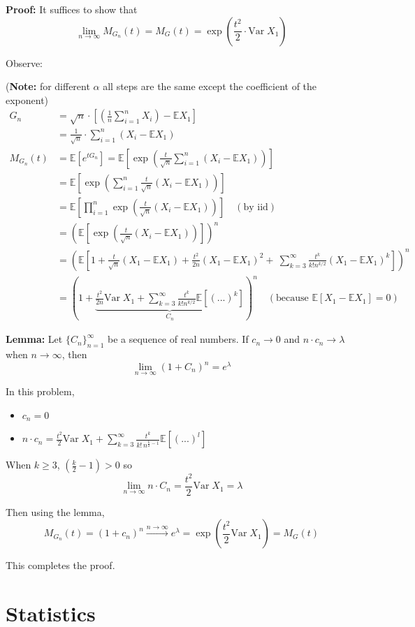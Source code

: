 \documentclass[12pt]{article}
\newcommand{\E}{\mathbb{E}}
\newcommand{\Var}{\text{Var}\;}
\begin{document}
\textbf{Proof:}
It suffices to show that 
\[\lim_{n\to \infty} M_{G_n}(t) = M_G(t) = \exp(\frac{t^2}{2} \cdot \Var X_1)\]

Observe:

(\textbf{Note:} for different $\alpha$ all steps are the same except the coefficient of the exponent)
\begin{align*}
    G_n &= \sqrt{n} \cdot \left[\left(\frac{1}{n}\sum_{i=1}^n X_i\right) - \E X_1\right]\\
    &= \frac{1}{\sqrt{n}} \cdot \sum_{i=1}^n (X_i - \E X_1)\\
    M_{G_n}(t) &= \E[e^{tG_n}] = \E[\exp(\frac{t}{\sqrt{n}} \sum_{i=1}^n (X_i - \E X_1))]\\
    &= \E \left[\exp(\sum_{i=1}^n \frac{t}{\sqrt{n}}(X_i - \E X_1))\right]\\
    &= \E\left[\prod_{i=1}^n \exp\left(\frac{t}{\sqrt{n}}(X_i - \E X_1)\right)\right] \quad (\text{by iid})\\
    &= \left(\E \left[\exp\left(\frac{t}{\sqrt{n}}(X_i - \E X_1)\right)\right]\right)^n\\
    &= \left(\E\left[1 + \frac{t}{\sqrt{n}}(X_1- \E X_1) + \frac{t^2}{2n}(X_1 - \E X_1)^2 +\ \sum_{k=3}^\infty \frac{t^k}{k! n^{k/2}}(X_1 - \E X_1)^k\right]\right)^n\\
    &= \left(1 + \underbrace{\frac{t^2}{2n}\Var X_1 + \sum_{k=3}^\infty \frac{t^k}{k! n^{k/2}}\E[(...)^k]}_{C_n}\right)^n \quad (\text{because } \E[X_1 - \E X_1] = 0)
\end{align*}

\textbf{Lemma:} Let $\{C_n\}_{n=1}^\infty$ be a sequence of real numbers. If $c_n \to 0$ and $n \cdot c_n \to \lambda$ when $n \to \infty$, then 
\[\lim_{n \to \infty} (1 + C_n)^n = e^\lambda\]

In this problem,
\begin{itemize}
    \item $c_n = 0$
    \item $n\cdot c_n = \frac{t^2}{2} \Var X_1 + \sum_{k=3}^\infty \frac{t^k}{k!\, n^{\frac{k}{2} - 1}} \E[(...)^l]$
\end{itemize}
When $k \geq 3$, $\left(\frac{k}{2} - 1\right) > 0$ so 
\[\lim_{n\to \infty} n \cdot C_n = \frac{t^2}{2}\Var X_1 = \lambda\]

Then using the lemma, 
\[M_{G_n}(t) = (1 + c_n)^n \overset{n \to \infty}{\longrightarrow} e^\lambda = \exp(\frac{t^2}{2}\Var X_1) = M_{G}(t)\]

This completes the proof. 
\pagebreak 
\section*{\textbf{Statistics}}
\end{document}
